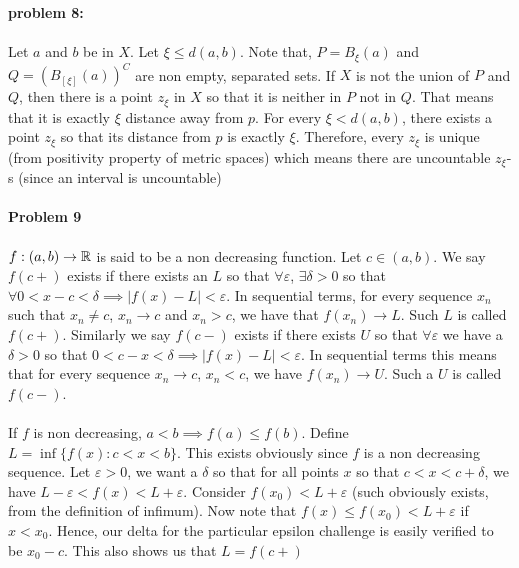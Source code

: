 \documentclass[../Main.tex]{subfiles}
\begin{document}
\\\\ \textbf{problem 8:}
\\\\ Let $a$ and $b$ be in $X$. Let $\xi\leq d(a,b)$. 
Note that, $P=B_{\xi}(a)$ and $Q=(B_{[\xi]}(a))^C$ are non empty, separated sets.
If $X$ is not the union of $P$ and $Q$, then there is a point $z_{\xi}$ in $X$ so that it is neither in $P$
not in $Q$. That means that it is exactly $\xi$ distance away from $p$. For every $\xi<d(a,b)$,
there exists a point $z_{\xi}$ so that its distance from $p$ is exactly $\xi$. Therefore, every $z_{\xi}$ 
is unique (from positivity property of metric spaces) which means there are uncountable $z_{\xi}$-s (since an interval is uncountable)
\\\\ \textbf{Problem 9}
\\\\ $f:(a,b) \to \mathbb R$ is said to be a non decreasing function. Let $c \in (a,b)$. We say $f(c+)$ exists if there exists an $L$ so that $\forall \varepsilon$, $\exists \delta>0$ so that $\forall 0<x-c<\delta \implies |f(x)-L|<\varepsilon$. In sequential terms, for every sequence $x_n$ such that $x_n \neq c$, $x_n \to c$ and $x_n>c$, we have that $f(x_n)\to L $. Such $L$ is called $f(c+)$. Similarly we say $f(c-)$ exists if there exists $U$ so that $\forall \varepsilon$ we have a $\delta>0$ so that $0<c-x<\delta \implies |f(x)-L|<\varepsilon$. In sequential terms this means that for every sequence $x_n \to c$, $x_n<c$, we have $f(x_n) \to U$. Such a $U$ is called $f(c-)$.
\\\\ If $f$ is non decreasing, $a<b \implies f(a)\leq f(b)$. Define $L=\inf\{f(x):c<x<b\}$. This exists obviously since $f$ is a non decreasing sequence. Let $\varepsilon>0$, we want a $\delta$ so that for all points $x$ so that $c<x<c+\delta$, we have $L-\varepsilon<f(x)<L+\varepsilon$. Consider $f(x_0)<L+\varepsilon$ (such obviously exists, from the definition of infimum). Now note that $f(x)\leq f(x_0)<L+\varepsilon$ if $x<x_0$. Hence, our delta for the particular epsilon challenge is easily verified to be $x_0-c$. This also shows us that $L=f(c+)$
\end{document}
